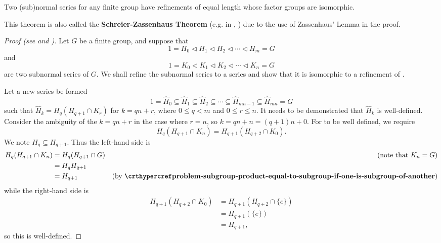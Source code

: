 \begin{theorem}\label{thrm-schreier}
    Two (sub)normal series for any finite group have refinements of equal length whose factor groups are isomorphic.
\end{theorem}
\begin{remark}
    This theorem is also called the \textbf{Schreier-Zassenhaus Theorem} (e.g. in {\cite[\S 72]{clark_1984}}, \cite{proofwiki_schreier-zassenhaus}) due to the use of Zassenhaus' Lemma in the proof.
\end{remark}
\begin{proof}[Proof (see {\cite[\S 72]{clark_1984}} and \cite{proofwiki_schreier-zassenhaus})]
    Let $G$ be a finite group, and suppose that
    \begin{equation}\label{eqn:thrm-schreier-eqn-a}
        1 = H_0 \lhd H_1 \lhd H_2 \lhd \cdots \lhd H_m = G
        \tag{A}
    \end{equation}
    and
    \begin{equation}\label{eqn:thrm-schreier-eqn-b}
        1 = K_0 \lhd K_1 \lhd K_2 \lhd \cdots \lhd K_n = G
        \tag{B}
    \end{equation}
    are two subnormal series of $G$. We shall refine the subnormal series  to a series  and show that it is isomorphic to a refinement  of .

    Let a new series be formed
    \begin{equation}\label{eqn:thrm-schreier-eqn-a-prime}
        1 = \hat{H}_0 \subseteq \hat{H}_1 \subseteq \hat{H}_2 \subseteq \cdots \subseteq \hat{H}_{mn - 1} \subseteq \hat{H}_{mn} = G
        \tag{A'}
    \end{equation}
    such that $\hat{H}_k = H_q(H_{q+1}\cap K_r)$ for $k = qn + r$, where $0 \leq q < m$ and $0 \leq r \leq n$. It needs to be demonstrated that $\hat{H}_k$ is well-defined. Consider the ambiguity of the $k = qn + r$ in the case where $r = n$, so $k = qn + n = (q+1)n + 0$. For  to be well defined, we require
    \[
        H_q(H_{q+1} \cap K_n) = H_{q+1}(H_{q+2} \cap K_0).
    \]
    We note $H_q \subseteq H_{q+1}$. Thus the left-hand side is
    \begin{align*}
        H_q(H_{q+1} \cap K_n) &= H_q(H_{q+1} \cap G) & (\text{note that } K_n = G)\\
        &= H_qH_{q+1}\\
        &= H_{q+1} & (\text{by \myref{problem-subgroup-product-equal-to-subgroup-if-one-is-subgroup-of-another}})
    \end{align*}
    while the right-hand side is
    \begin{align*}
        H_{q+1}(H_{q+2} \cap K_0) &= H_{q+1}(H_{q+2} \cap \{e\})\\
        &= H_{q+1}(\{e\})\\
        &= H_{q+1},
    \end{align*}
    so this is well-defined.


\end{proof}
